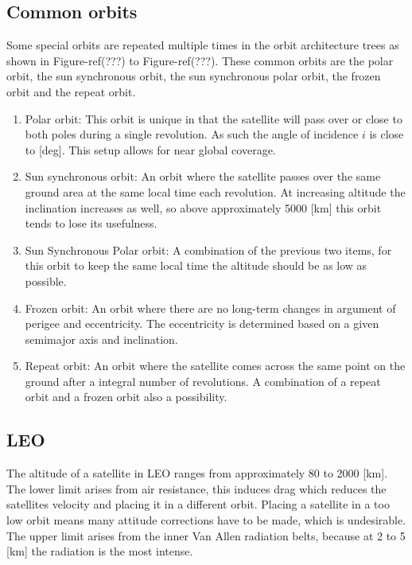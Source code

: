 \subsection {Common orbits}
\label{sec:blOrbCommon}
Some special orbits are repeated multiple times in the orbit architecture trees as shown in Figure-ref(???) to Figure-ref(???). These common orbits are the polar orbit, the sun synchronous orbit, the sun synchronous polar orbit, the frozen orbit and the repeat orbit.

\begin{enumerate}
	\item Polar orbit:
	This orbit is unique in that the satellite will pass over or close to both poles during a single revolution. As such the angle of incidence $i$ is close to   [deg]. This setup allows for near global coverage.
	\item Sun synchronous orbit:
	An orbit where the satellite passes over the same ground area at the same local time each revolution. At increasing altitude the inclination increases as well, so above approximately 5000 [km]\cite{larson} this orbit tends to lose its usefulness. 
	\item Sun Synchronous Polar orbit:
	A combination of the previous two items, for this orbit to keep the same local time the altitude should be as low as possible.
	\item Frozen orbit:
	An orbit where there are no long-term changes in argument of perigee and eccentricity. The eccentricity is determined based on a given semimajor axis and inclination.
	\item Repeat orbit:
	An orbit where the satellite comes across the same point on the ground after a integral number of revolutions. A combination of a repeat orbit and a frozen orbit also a possibility.
\end{enumerate}

\subsection{\ac{LEO}}
\label{sec:blOrb1}
The altitude of a satellite in \acs{LEO} ranges from approximately 80 to 2000 [km]\cite{nasaOrbit}. The lower limit arises from air resistance, this induces drag which reduces the satellites velocity and placing it in a different orbit. Placing a satellite in a too low orbit means many attitude corrections have to be made, which is undesirable. The upper limit arises from the inner Van Allen radiation belts, because at 2 to 5 [km]\cite{sse} the radiation is the most intense.

